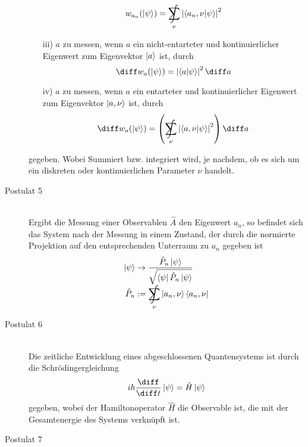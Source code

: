 \documentclass[11pt]{article}
\DeclareMathOperator*{\SumInt}{%
\mathchoice%
  {\ooalign{$\displaystyle\sum$\cr\hidewidth$\displaystyle\int$\hidewidth\cr}}
  {\ooalign{\raisebox{.14\height}{\scalebox{.7}{$\textstyle\sum$}}\cr\hidewidth$\textstyle\int$\hidewidth\cr}}
  {\ooalign{\raisebox{.2\height}{\scalebox{.6}{$\scriptstyle\sum$}}\cr$\scriptstyle\int$\cr}}
  {\ooalign{\raisebox{.2\height}{\scalebox{.6}{$\scriptstyle\sum$}}\cr$\scriptstyle\int$\cr}}
}
\numberwithin{equation}{section}
\begin{document}
\begin{description}
\begin{itemize}
\begin{equation}
              w_{a_n}(\Ket{\psi}) = \SumInt_\nu \left|\braket{a_n ,\nu|\psi}\right|^2
            \end{equation}
            \item[iii)] $a$ zu messen, wenn $a$ ein nicht-entarteter und kontinuierlicher Eigenwert zum Eigenvektor $\Ket{a}$ ist, durch
            \begin{equation}
              \diff w_a(\Ket{\psi}) = \left| \braket{a|\psi} \right|^2 \diff a
            \end{equation}
            \item[iv)] $a$ zu messen, wenn $a$ ein entarteter und kontinuierlicher Eigenwert zum Eigenvektor $\Ket{a, \nu}$ ist, durch
            \begin{equation}
              \diff w_a(\Ket{\psi}) = \left( \SumInt_\nu \left| \braket{a,\nu |\psi} \right|^2 \right) \diff a
            \end{equation}
          \end{itemize}
          gegeben. Wobei Summiert bzw. integriert wird, je nachdem, ob es sich um ein diskreten oder kontinuierlichen Parameter $\nu$ handelt.
        \item[Postulat 5]\hfill \\
          Ergibt die Messung einer Observablen $\hat{A}$ den Eigenwert $a_n$, so befindet sich das System nach der Messung in einem Zustand, der durch die normierte Projektion auf den entsprechenden Unterraum zu $a_n$ gegeben ist
          \begin{equation}
            \begin{aligned}
              \Ket{\psi} &\rightarrow \frac{\hat{P}_n\Ket{\psi}} {\sqrt{\Bra{\psi}\hat{P}_n\Ket{\psi}}} \\
              \hat{P}_n &:= \SumInt_\nu \Ket{a_n,\nu}\Bra{a_n,\nu} \\
            \end{aligned}
          \end{equation}
        \item[Postulat 6]\hfill \\
          Die zeitliche Entwicklung eines abgeschlossenen Quantensystems ist durch die Schrödingergleichung
          \begin{equation}
            i\hbar\tder{}{t}\Ket{\psi} = \hat{H}\Ket{\psi}
          \end{equation}
          gegeben, wobei der Hamiltonoperator $\hat{H}$ die Observable ist, die mit der Gesamtenergie des Systems verknüpft ist.
        \item[Postulat 7]\hfill \\

\end{description}
\end{document}
